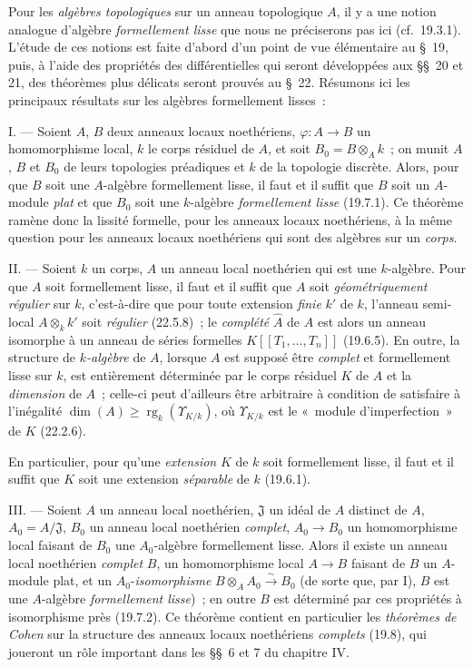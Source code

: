 \begin{env}[19.0.2]
\label{0.19.0.2-fr}
Pour les \emph{algèbres topologiques} sur un anneau topologique $A$, il y a une
notion analogue d'algèbre \emph{formellement lisse} que nous ne préciserons pas
ici (cf.~19.3.1). L'étude de ces notions est faite d'abord d'un point de vue
élémentaire au §~19, puis, à l'aide des propriétés des différentielles qui
seront développées aux §§~20 et 21, des théorèmes plus délicats seront prouvés
au §~22. Résumons ici les principaux résultats sur les algèbres formellement
lisses~:

\medskip\noindent I. --- Soient $A$, $B$ deux anneaux locaux
noethériens, $\varphi:A\to B$ un homomorphisme local, $k$ le corps résiduel de
$A$, et soit $B_0=B\otimes_A k$~; on munit $A$, $B$ et $B_0$ de leurs
topologies préadiques et $k$ de la topologie discrète. Alors, pour que $B$ soit
une $A$-algèbre formellement lisse, il faut et il suffit que $B$ soit un
$A$-module \emph{plat} et que $B_0$ soit une $k$-algèbre \emph{formellement
lisse} (19.7.1). Ce théorème ramène donc la lissité formelle, pour les anneaux
locaux noethériens, à la même question pour les anneaux locaux noethériens qui
sont des algèbres sur un \emph{corps}.

\medskip\noindent II. --- Soient $k$ un corps, $A$ un anneau local
noethérien qui est une $k$-algèbre. Pour que $A$ soit formellement lisse, il
faut et il suffit que $A$ soit \emph{géométriquement régulier} sur $k$,
c'est-à-dire que pour toute extension \emph{finie} $k'$ de $k$, l'anneau
semi-local $A\otimes_k k'$ soit
\emph{régulier} (22.5.8)~; le \emph{complété} $\widehat A$ de $A$ est alors
un anneau isomorphe à un anneau de séries formelles
$K[[T_1,\ldots,T_n]]$ (19.6.5). En outre, la structure de \emph{$k$-algèbre} de $A$,
lorsque $A$ est supposé être \emph{complet} et formellement lisse sur $k$, est
entièrement déterminée par le corps résiduel $K$ de $A$ et la \emph{dimension}
de $A$~; celle-ci peut d'ailleurs être arbitraire à condition de satisfaire à
l'inégalité
$\dim(A)\geq \operatorname{rg}_k(\Upsilon_{K/k})$,
où $\Upsilon_{K/k}$ est le «~module d'imperfection~» de $K$ (22.2.6).

En particulier, pour qu'une \emph{extension} $K$ de $k$ soit formellement
lisse, il faut et il suffit que $K$ soit une extension \emph{séparable} de $k$
(19.6.1).

\medskip\noindent III. --- Soient $A$ un anneau local noethérien,
$\mathfrak J$ un idéal de $A$ distinct de $A$, $A_0=A/\mathfrak J$, $B_0$ un
anneau local noethérien \emph{complet}, $A_0\to B_0$ un homomorphisme local
faisant de $B_0$ une $A_0$-algèbre formellement lisse. Alors il existe un
anneau local noethérien \emph{complet} $B$, un homomorphisme local $A\to B$
faisant de $B$ un $A$-module plat, et un $A_0$-\emph{isomorphisme}
$B\otimes_A A_0\xrightarrow{\sim}B_0$
(de sorte que, par I), $B$ est une $A$-algèbre \emph{formellement lisse})~; en
outre $B$ est déterminé par ces propriétés à isomorphisme près (19.7.2). Ce
théorème contient en particulier les \emph{théorèmes de Cohen} sur la structure
des anneaux locaux noethériens \emph{complets} (19.8), qui joueront un rôle
important dans les §§~6 et 7 du chapitre IV.


\end{env}
